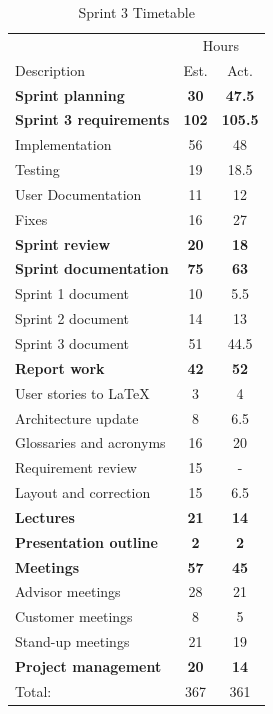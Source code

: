 \begin{table}[!htb] \small \center
\caption{Sprint 3 Timetable\label{tab:sprint3time}}
\begin{tabularx}{\textwidth}{X c c}
	\toprule
	& \multicolumn{2}{c}{Hours} \\
	\cmidrule(r){2-3}
	Description & Est. & Act. \\
	\midrule
	\textbf{Sprint planning} & \textbf{30} & \textbf{47.5} \\
	\addlinespace
	\textbf{Sprint 3 requirements} & \textbf{102} & \textbf{105.5} \\
	Implementation & 56 & 48 \\
	Testing & 19 & 18.5 \\
	User Documentation & 11 & 12 \\
	Fixes & 16 & 27 \\
	\addlinespace
	\textbf{Sprint review} & \textbf{20} & \textbf{18} \\
	\addlinespace
	\textbf{Sprint documentation} & \textbf{75} & \textbf{63} \\
	Sprint 1 document & 10 & 5.5\\
	Sprint 2 document & 14 & 13 \\
	Sprint 3 document & 51 & 44.5 \\
	\addlinespace
	\textbf{Report work} & \textbf{42} & \textbf{52} \\
	User stories to LaTeX & 3 & 4\\
	Architecture update & 8 & 6.5\\
	Glossaries and acronyms & 16 & 20\\
	Requirement review & 15 & -\\
	Layout and correction & 15 & 6.5 \\
	\addlinespace
	\textbf{Lectures} & \textbf{21} & \textbf{14} \\
	\addlinespace
	\textbf{Presentation outline} & \textbf{2} & \textbf{2} \\
	\addlinespace
	\textbf{Meetings} & \textbf{57} & \textbf{45} \\
	Advisor meetings & 28 & 21 \\
	Customer meetings & 8 & 5 \\
	Stand-up meetings & 21 & 19 \\
	\textbf{Project management} & \textbf{20} & \textbf{14} \\
	\midrule
	Total: & 367 & 361 \\
	\bottomrule
\end{tabularx}
\end{table}


